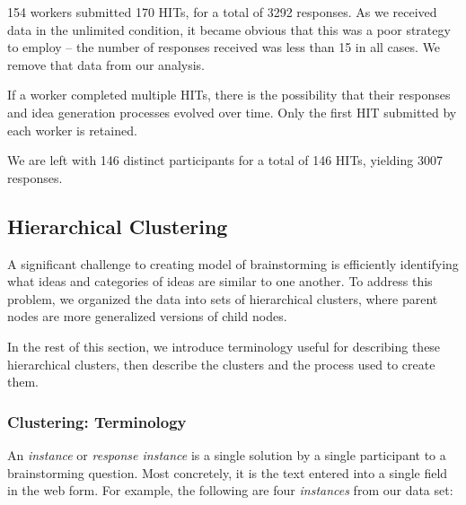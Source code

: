 154 workers submitted 170 HITs, for a total of 3292 responses. As we received data in the unlimited condition, it became obvious that this was a poor strategy to employ -- the number of responses received was less than 15 in all cases. We remove that data from our analysis.

If a worker completed multiple HITs, there is the possibility that their responses and idea generation processes evolved over time. Only the first HIT submitted by each worker is retained.

We are left with 146 distinct participants for a total of 146 HITs, yielding 3007 responses. %



\subsection{Hierarchical Clustering}
A significant challenge to creating model of brainstorming is efficiently identifying what ideas and categories of ideas are similar to one another. To address this problem, we organized the data into sets of hierarchical clusters, where parent nodes are more generalized versions of child nodes. %

In the rest of this section, we introduce terminology useful for describing these hierarchical clusters, then describe the clusters and the process used to create them.

\subsubsection{Clustering: Terminology}
An \emph{instance} or \emph{response instance} is a single solution by a single participant to a brainstorming question. Most concretely, it is the text entered into a single field in the web form. For example, the following are four \emph{instances} from our data set:

